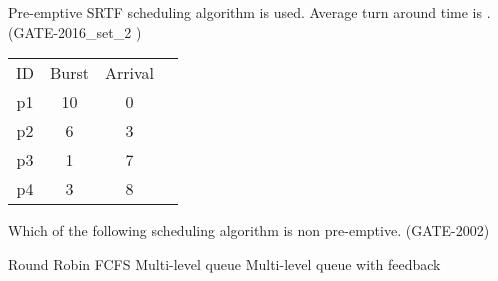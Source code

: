 \vspace{0.08in}



\begin{minipage}{\linewidth}

  \question Pre-emptive SRTF scheduling algorithm is used. Average turn around time is \fillin[time]. (GATE-2016\_set\_2 )
      \begin{center}
      \begin{tabular}{ c c c c }
          ID & Burst & Arrival\\
          p1 & 10  & 0 \\
          p2 & 6  & 3 \\
          p3 & 1  & 7 \\
          p4 & 3  & 8 \\
      \end{tabular}
    \end{center}

  \end{minipage}

\vspace{0.08in}



\begin{minipage}{\linewidth}

  \question  Which of the following scheduling algorithm is non pre-emptive. (GATE-2002)

  \begin{choices}
    \choice Round Robin
    \choice FCFS
    \choice Multi-level queue
    \choice Multi-level queue with feedback
  \end{choices}

  \end{minipage}

\vspace{0.08in}


\begin{comment}

\begin{minipage}{\linewidth}

  \question  (GATE- )

  \begin{choices}
    \choice
    \choice
    \choice
    \choice
  \end{choices}

  \end{minipage}

\vspace{0.08in}



\end{comment}
